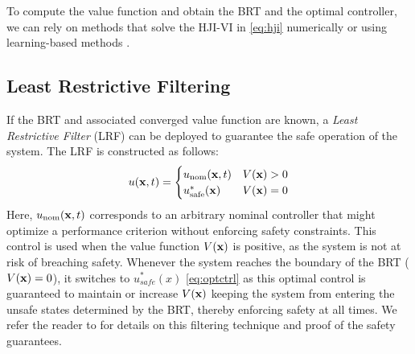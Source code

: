 To compute the value function and obtain the BRT and the optimal controller, we can rely on methods that solve the HJI-VI in \eqref{eq:hji} numerically \cite{mitchell2004toolbox,hj_reach_ASL2023} or using learning-based methods \cite{bansal2021deepreach,fisac2019bridging}.
\subsection{\label{background_lr}Least Restrictive Filtering}

If the BRT and associated converged value function are known, a \textit{Least Restrictive Filter} (LRF) can be deployed to guarantee the safe operation of the system.
The LRF is constructed as follows:
% 
\begin{equation}\label{eq:lst_restrict_safety_ctrl}
u(\mathbf{x}, t) = \begin{cases}
  u_{\text{nom}}(\mathbf{x}, t) & V(\mathbf{x})> 0 \\
   u^*_{\text{safe}}(\mathbf{x}) & V(\mathbf{x}) = 0
\end{cases}
\end{equation}
% 
Here, $u_{\text{nom}}(\mathbf{x}, t)$ corresponds to an arbitrary nominal controller that might optimize a performance criterion without enforcing safety constraints. This control is used when the value function $V(\mathbf{x})$ is positive, as the system is not at risk of breaching safety. Whenever the system reaches the boundary of the BRT ($V(\mathbf{x})=0$), it switches to $u^{*}_{safe}(x)$ \eqref{eq:optctrl} as this optimal control is guaranteed to maintain or increase $V(\mathbf{x})$ keeping the system from entering the unsafe states determined by the BRT, thereby enforcing safety at all times. We refer the reader to \cite{borquezFiltering2023} for details on this filtering technique and proof of the safety guarantees.


